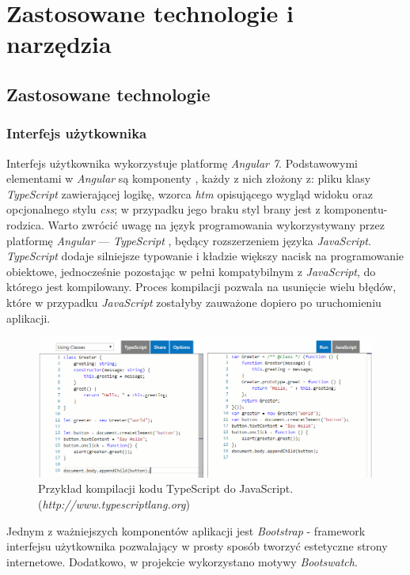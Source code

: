 \documentclass[eng,printmode,openany]{mgr}
\begin{document}
	\chapter{Zastosowane technologie i narzędzia}
	\section{Zastosowane technologie}
	\subsection{Interfejs użytkownika}
	Interfejs użytkownika wykorzystuje platformę \textit{Angular 7}. Podstawowymi elementami w \textit{Angular} są komponenty \cite{angular-components}, każdy z nich złożony z: pliku klasy \textit{TypeScript} zawierającej logikę, wzorca \textit{htm} opisującego wygląd widoku oraz opcjonalnego stylu \textit{css}; w przypadku jego braku styl brany jest z komponentu-rodzica. Warto zwrócić uwagę na język programowania wykorzystywany przez platformę \textit{Angular} — \textit{TypeScript} \cite{msdn-ts}, będący rozszerzeniem języka \textit{JavaScript}. \textit{TypeScript} dodaje silniejsze typowanie i kładzie większy nacisk na programowanie obiektowe, jednocześnie pozostając w pełni kompatybilnym z \textit{JavaScript}, do którego jest kompilowany. Proces kompilacji pozwala na usunięcie wielu błędów, które w przypadku \textit{JavaScript} zostałyby zauważone dopiero po uruchomieniu aplikacji.
	\begin{figure}[H]
		\centering
		\includegraphics[width=\textwidth]{images/ts-to-js.png}
		\caption{Przykład kompilacji kodu TypeScript do JavaScript. (\textit{http://www.typescriptlang.org})}
	\end{figure}
	Jednym z ważniejszych komponentów aplikacji jest \textit{Bootstrap} - framework interfejsu użytkownika pozwalający w prosty sposób tworzyć estetyczne strony internetowe. Dodatkowo, w projekcie wykorzystano motywy \textit{Bootswatch}.
	
\end{document}
